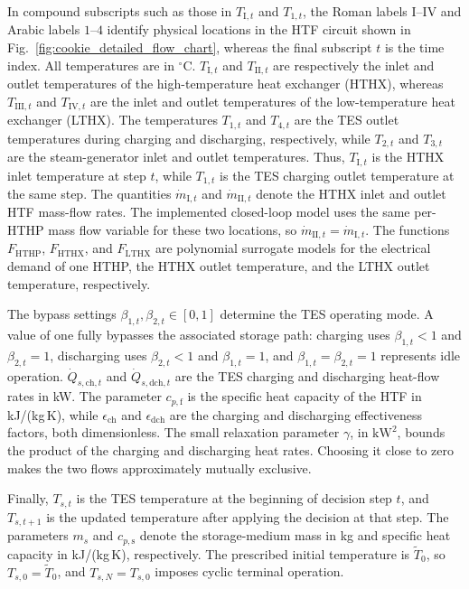 \documentclass[12pt]{article}
\begin{document}
In compound subscripts such as those in $T_{\mathrm{I},t}$ and $T_{1,t}$, the
Roman labels $\mathrm I$--$\mathrm{IV}$ and Arabic labels $1$--$4$ identify
physical locations in the HTF circuit shown in Fig.~\ref{fig:cookie_detailed_flow_chart}, whereas the final subscript $t$ is the time index. All temperatures are in ${}^\circ\mathrm C$.
$T_{\mathrm{I},t}$ and $T_{\mathrm{II},t}$ are respectively the inlet and outlet
temperatures of the high-temperature heat exchanger (HTHX), whereas
$T_{\mathrm{III},t}$ and $T_{\mathrm{IV},t}$ are the inlet and outlet
temperatures of the low-temperature heat exchanger (LTHX). The temperatures
$T_{1,t}$ and $T_{4,t}$ are the TES outlet temperatures during charging and
discharging, respectively, while $T_{2,t}$ and $T_{3,t}$ are the steam-generator
inlet and outlet temperatures. Thus, $T_{\mathrm{I},t}$ is the HTHX inlet
temperature at step $t$, while $T_{1,t}$ is the TES charging outlet
temperature at the same step. The quantities $\dot{m}_{\mathrm{I},t}$ and
$\dot{m}_{\mathrm{II},t}$ denote the HTHX inlet and outlet HTF mass-flow
rates. The implemented closed-loop model uses the same per-HTHP  mass flow variable
for these two locations, so $\dot{m}_{\mathrm{II},t}=\dot{m}_{\mathrm{I},t}$. The functions $F_{\mathrm{HTHP}}$,
$F_{\mathrm{HTHX}}$, and $F_{\mathrm{LTHX}}$ are polynomial surrogate models
for the electrical demand of one HTHP, the HTHX outlet temperature, and the
LTHX outlet temperature, respectively.

The bypass settings $\beta_{1,t},\beta_{2,t}\in[0,1]$ determine the TES operating
mode. A value of one fully bypasses the associated storage path: charging uses
$\beta_{1,t}<1$ and $\beta_{2,t}=1$, discharging uses $\beta_{2,t}<1$ and
$\beta_{1,t}=1$, and $\beta_{1,t}=\beta_{2,t}=1$ represents idle operation.
$\dot{Q}_{s,\mathrm{ch},t}$ and $\dot{Q}_{s,\mathrm{dch},t}$ are the TES charging
and discharging heat-flow rates in kW. The parameter
$c_{p,\mathrm f}$ is the specific heat capacity of the HTF in kJ/(kg\,K), while
$\epsilon_{\mathrm{ch}}$ and $\epsilon_{\mathrm{dch}}$ are the charging and
discharging effectiveness factors, both dimensionless. The small relaxation
parameter $\gamma$, in $\mathrm{kW}^2$, bounds the product of the charging
and discharging heat rates. Choosing it close to zero makes the two flows
approximately mutually exclusive.

Finally, $T_{s,t}$ is the TES temperature at the beginning of decision step $t$,
and $T_{s,t+1}$ is the updated temperature after applying the decision at that
step. The parameters $m_s$ and $c_{p,\mathrm s}$ denote the storage-medium mass
in kg and specific heat capacity in kJ/(kg\,K), respectively. The prescribed
initial temperature is
$\tilde T_0$, so $T_{s,0}=\tilde T_0$, and $T_{s,N}=T_{s,0}$ imposes cyclic terminal
operation.
\end{document}
